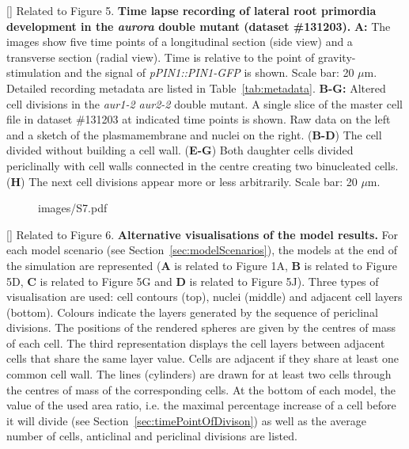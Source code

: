 \clearpage
{}[]{
Related to Figure 5.
{\bf Time lapse recording of lateral root primordia development in the \emph{aurora} double mutant (dataset \#131203).}
{\bf A:} The images show five time points of a longitudinal section (side view) and a transverse section (radial view). Time is relative to the point of gravity-stimulation and the signal of \emph{pPIN1::PIN1-GFP }is shown. Scale bar: 20 $\mu$m. Detailed recording metadata are listed in Table~\ref{tab:metadata}. {\bf B-G:} Altered cell divisions in the \emph{aur1-2 aur2-2} double mutant. A single slice of the master cell file in dataset \#131203 at indicated time points is shown. Raw data on the left and a sketch of the plasmamembrane and nuclei on the right. (\textbf{B-D}) The cell divided without building a cell wall. (\textbf{E-G}) Both daughter cells divided periclinally with cell walls connected in the centre creating two binucleated cells. (\textbf{H}) The next cell divisions appear more or less arbitrarily. Scale bar: 20 $\mu$m.
}
\label{fig:S6}
%
\clearpage
%
\begin{figure}[htbp]
\centering
	\begin{overpic}[width=1.\linewidth]{images/S7.pdf}
	\end{overpic}
\end{figure}
\clearpage
{}[]{
Related to Figure 6.
{\bf Alternative visualisations of the model results.} For each model scenario (see Section~\ref{sec:modelScenarios}), the models at the end of the simulation are represented (\textbf{A} is related to Figure 1A, \textbf{B} is related to Figure 5D, \textbf{C} is related to Figure 5G and \textbf{D} is related to Figure 5J). Three types of visualisation are used: cell contours (top), nuclei (middle) and adjacent cell layers (bottom). Colours indicate the layers generated by the sequence of periclinal divisions. The positions of the rendered spheres are given by the centres of mass of each cell. The third representation displays the cell layers between adjacent cells that share the same layer value. Cells are adjacent if they share at least one common cell wall. The lines (cylinders) are drawn for at least two cells through the centres of mass of the corresponding cells. At the bottom of each model, the value of the used area ratio, i.e. the maximal percentage increase of a cell before it will divide (see Section~\ref{sec:timePointOfDivison}) as well as the average number of cells, anticlinal and periclinal divisions are listed.
}
\label{fig:S7}
%
\clearpage




